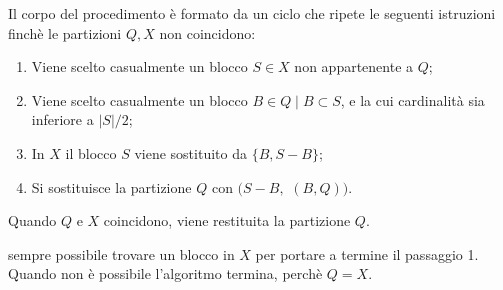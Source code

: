 Il corpo del procedimento è formato da un ciclo che ripete le seguenti istruzioni finchè le partizioni $Q,X$ non coincidono:
\begin{enumerate}
    \item Viene scelto casualmente un blocco $S \in X$ non appartenente a $Q$;
    \item Viene scelto casualmente un blocco $B \in Q \mid B \subset S$, e la cui cardinalità sia inferiore a $|S|/2$;
    \item In $X$ il blocco $S$ viene sostituito da $\{B, S-B\}$;
    \item Si sostituisce la partizione $Q$ con \splitfunc$(S-B,$ \splitfunc$(B,Q))$.
\end{enumerate}

Quando $Q$ e $X$ coincidono, viene restituita la partizione $Q$.

\begin{observation}
    \accente sempre possibile trovare un blocco in $X$ per portare a termine il passaggio 1. Quando non è possibile l'algoritmo termina, perchè $Q = X$.
\end{observation}

